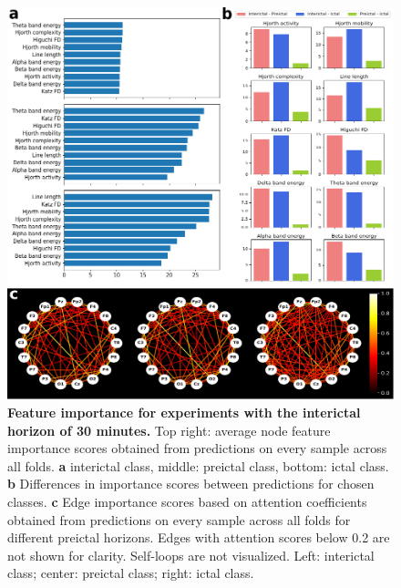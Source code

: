 \documentclass[a4paper,fleqn]{cas-sc}
\begin{document}
\begin{figure}[h]
    \centering
    \includegraphics[width=\linewidth]{figures/lookback_1800.pdf}
    \caption{\textbf{Feature importance for experiments with the interictal horizon of 30 minutes.} Top right: average node feature importance scores obtained from predictions on every sample across all folds. \textbf{a} interictal class, middle: preictal class, bottom: ictal class. \textbf{b} Differences in importance scores between predictions for chosen classes. \textbf{c} Edge importance scores based on attention coefficients obtained from predictions on every sample across all folds for different preictal horizons. Edges with attention scores below 0.2 are not shown for clarity. Self-loops are not visualized. Left: interictal class; center: preictal class; right: ictal class.}
    \label{figs6:lookback_1800}
\end{figure}
\end{document}

